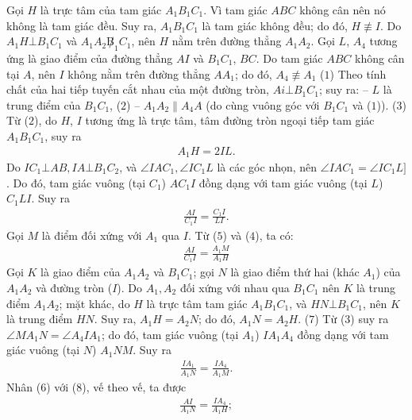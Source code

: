 \begin{multicols}{2}
	Gọi $H$ là trực tâm của tam giác $A_1B_1C_1$.
	\vskip 0.05cm 
	Vì tam giác $ABC$ không cân nên nó không là tam giác đều. Suy ra, $A_1B_1C_1$  là tam giác không đều; do đó,  $H \not\equiv I$.
	\vskip 0.05cm
	Do $A_1H \bot B_1C_1$  và  $A_1A_2 \not B_1C_1$, nên $H$ nằm trên đường thẳng  $A_1A_2$.
	\vskip 0.05cm
	Gọi $L$, $A_4$  tương ứng là giao điểm của đường thẳng $AI$ và  $B_1C_1$, $BC$.
	\vskip 0.05cm
	Do tam giác $ABC$ không cân tại $A$, nên $I$ không nằm trên đường thẳng $AA_1$; do đó, $A_4 \not\equiv A_1$    \hfill ($1$)
	\vskip 0.05cm 
	Theo tính chất của hai tiếp tuyến cắt nhau của một đường tròn,  $Ai \bot B_1C_1$; suy ra:
	\vskip 0.05cm
	-- $L$ là trung điểm của $B_1C_1$, \hfill ($2$)
	\vskip 0.05cm
	-- $A_1A_2 \parallel A_4A$  (do cùng vuông góc với  $B_1C_1$ và ($1$)). \hfill($3$)
	\vskip 0.05cm
	Từ ($2$), do $H$, $I$ tương ứng là trực tâm, tâm đường tròn ngoại tiếp tam giác  $A_1B_1C_1$, suy ra
	\begin{align*}
		A_1H = 2IL. \tag{$4$}
	\end{align*}
	Do  $IC_1 \bot AB, IA \bot B_1C_2$, và  $\angle IAC_1, \angle IC_1L$ là các góc nhọn, nên $\angle IAC_1 = \angle IC_1L]$. Do đó, tam giác vuông (tại  $C_1$) $AC_1I$   đồng dạng với tam giác vuông (tại $L$) $C_1LI$.  Suy ra
	\begin{align*}
		\frac{{AI}}{{{C_1}I}} = \frac{{{C_1}I}}{{LI}}.\tag{$5$}
	\end{align*}
	Gọi $M$ là điểm đối xứng với $A_1$  qua $I$. Từ ($5$) và ($4$), ta có:
	\begin{align*}
		\frac{{AI}}{{{C_1}I}} = \frac{{{A_1}M}}{{{A_1}H}} \tag{$6$}
	\end{align*}
	Gọi $K$ là giao điểm của $A_1A_2$ và  $B_1C_1$; gọi $N$ là giao điểm thứ hai (khác $A_1$) của  $A_1A_2$ và đường tròn ($I$).
	\vskip 0.05cm
	Do $A_1, A_2$  đối xứng với nhau qua  $B_1C_1$ nên $K$ là trung điểm $A_1A_2$;  mặt khác, do $H$ là trực tâm tam giác $A_1B_1C_1$, và  $HN \bot B_1C_1$, nên $K$ là trung điểm $HN$. Suy ra, $A_1H = A_2N$; do đó, $A_1N = A_2H$. \hfill  ($7$)
	\vskip 0.05cm
	Từ ($3$) suy ra  $\angle MA_1N = \angle A_4IA_1$; do đó, tam giác vuông (tại  $A_1$) $IA_1A_4$ đồng dạng với tam giác vuông (tại $N$) $A_1NM$.  Suy ra
	\begin{align*}
		\frac{{I{A_1}}}{{{A_1}N}} = \frac{{I{A_4}}}{{{A_1}M}}. \tag{$8$}
	\end{align*}
	Nhân ($6$) với ($8$), vế theo vế, ta được
	\begin{align*}
		\frac{{AI}}{{{A_1}N}} = \frac{{I{A_4}}}{{{A_1}H}};
	\end{align*}

\end{multicols}
